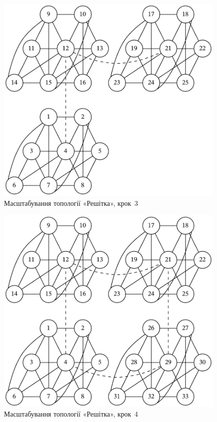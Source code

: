 \documentclass[
	a4paper,
	oneside,
	BCOR = 10mm,
	DIV = 12,
	12pt,
	headings = normal,
]{scrartcl}
\begin{document}
				\begin{figure}[!htbp]
					\centering
					\includegraphics[height=12\baselineskip]{./assets/cluster-08-05-grid-s03.pdf}
					\caption{Масштабування топології «Решітка», крок~3}
					\label{fig:cluster-08-05-grid-s03}
				\end{figure}

				\begin{figure}[!htbp]
					\centering
					\includegraphics[height=12\baselineskip]{./assets/cluster-08-05-grid-s04.pdf}
					\caption{Масштабування топології «Решітка», крок~4}
					\label{fig:cluster-08-05-grid-s04}
				\end{figure}
\end{document}
